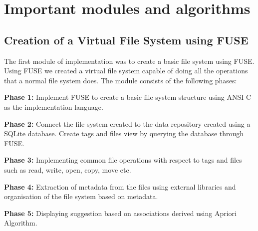 \section{Important modules and algorithms}

\subsection{Creation of a Virtual File System using FUSE}

The first module of implementation was to create a basic file system using FUSE. Using FUSE we created a virtual file system capable of doing all the operations that a normal file system does.
The module consists of the following phases:
\begin{list}{•}{•}

\item \textbf{Phase 1:} Implement FUSE to create a basic file system structure using ANSI C as the implementation language.

\item \textbf{Phase 2:} Connect the file system created to the data repository created using a SQLite database. Create tags and files view by querying the database through FUSE.

\item \textbf{Phase 3:} Implementing common file operations with respect to tags and files such as read, write, open, copy, move etc.

\item \textbf{Phase 4:} Extraction of metadata from the files using external libraries and organisation of the file system based on metadata.

\item \textbf{Phase 5:} Displaying suggestion based on associations derived using Apriori Algorithm. 
\end{list}

